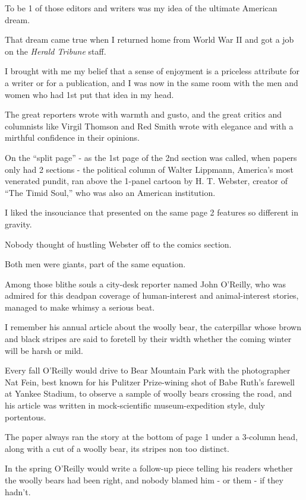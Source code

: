 \documentclass{book}
\numberwithin{equation}{section}
\begin{document}
To be 1 of those editors and writers was my idea of the ultimate American dream.

%
That dream came true when I returned home from World War II and got a job on the \textit{Herald Tribune} staff.

I brought with me my belief that a sense of enjoyment is a priceless attribute for a writer or for a publication, and I was now in the same room with the men and women who had 1st put that idea in my head.

The great reporters wrote with warmth and gusto, and the great critics and columnists like Virgil Thomson and Red Smith wrote with elegance and with a mirthful confidence in their opinions.

On the ``split page'' - as the 1st page of the 2nd section was called, when papers only had 2 sections - the political column of Walter Lippmann, America's most venerated pundit, ran above the 1-panel cartoon by H. T. Webster, creator of ``The Timid Soul,'' who was also an American institution.

I liked the insouciance that presented on the same page 2 features so different in gravity.

Nobody thought of hustling Webster off to the comics section.

Both men were giants, part of the same equation.

%
Among those blithe souls a city-desk reporter named John O'Reilly, who was admired for this deadpan coverage of human-interest and animal-interest stories, managed to make whimsy a serious beat.

I remember his annual article about the woolly bear, the caterpillar whose brown and black stripes are said to foretell by their width whether the coming winter will be harsh or mild.

Every fall O'Reilly would drive to Bear Mountain Park with the photographer Nat Fein, best known for his Pulitzer Prize-wining shot of Babe Ruth's farewell at Yankee Stadium, to observe a sample of woolly bears crossing the road, and his article was written in mock-scientific museum-expedition style, duly portentous.

The paper always ran the story at the bottom of page 1 under a 3-column head, along with a cut of a woolly bear, its stripes non too distinct.

In the spring O'Reilly would write a follow-up piece telling his readers whether the woolly bears had been right, and nobody blamed him - or them - if they hadn't.
\end{document}
